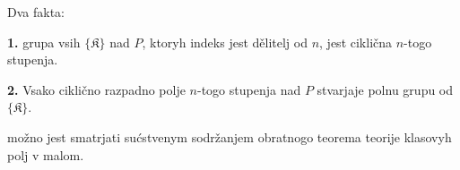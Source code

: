 \documentclass[11pt]{article}
\begin{document}
Dva fakta:

\noindent\textbf{1.} grupa vsih \(\{\mathfrak K\}\) nad \(P\), ktoryh indeks jest dělitelj od \(n\), jest ciklična \(n\)-togo stupenja.

\noindent\textbf{2.} Vsako ciklično razpadno polje \(n\)-togo stupenja nad \(P\) stvarjaje polnu grupu od \(\{\mathfrak K\}\).

možno jest smatrjati sućstvenym sodržanjem obratnogo teorema teorije klasovyh polj v malom.


\clearpage
\end{document}

